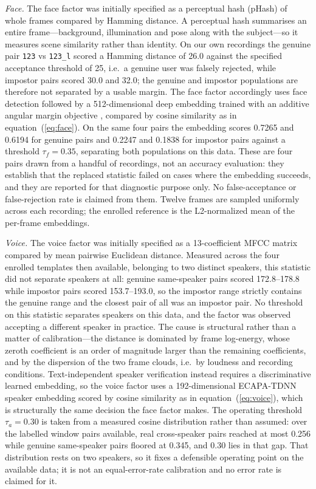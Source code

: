 \documentclass[10pt,journal,compsoc]{IEEEtran}
\begin{document}
{\emph{Face.} The face factor was initially specified as a perceptual hash (pHash) of whole frames compared by Hamming distance. A perceptual hash summarises an entire frame---background, illumination and pose along with the subject---so it measures scene similarity rather than identity. On our own recordings the genuine pair \texttt{123} vs \texttt{123\_l} scored a Hamming distance of 26.0 against the specified acceptance threshold of 25, i.e.\ a genuine user was falsely rejected, while impostor pairs scored 30.0 and 32.0; the genuine and impostor populations are therefore not separated by a usable margin. The face factor accordingly uses face detection followed by a 512-dimensional deep embedding trained with an additive angular margin objective \cite{arcface}, compared by cosine similarity as in equation~(\ref{eq:face}). On the same four pairs the embedding scores 0.7265 and 0.6194 for genuine pairs and 0.2247 and 0.1838 for impostor pairs against a threshold $\tau_f = 0.35$, separating both populations on this data. These are four pairs drawn from a handful of recordings, not an accuracy evaluation: they establish that the replaced statistic failed on cases where the embedding succeeds, and they are reported for that diagnostic purpose only. No false-acceptance or false-rejection rate is claimed from them. Twelve frames are sampled uniformly across each recording; the enrolled reference is the L2-normalized mean of the per-frame embeddings.

\emph{Voice.} The voice factor was initially specified as a 13-coefficient MFCC matrix compared by mean pairwise Euclidean distance. Measured across the four enrolled templates then available, belonging to two distinct speakers, this statistic did not separate speakers at all: genuine same-speaker pairs scored 172.8--178.8 while impostor pairs scored 153.7--193.0, so the impostor range strictly contains the genuine range and the closest pair of all was an impostor pair. No threshold on this statistic separates speakers on this data, and the factor was observed accepting a different speaker in practice. The cause is structural rather than a matter of calibration---the distance is dominated by frame log-energy, whose zeroth coefficient is an order of magnitude larger than the remaining coefficients, and by the dispersion of the two frame clouds, i.e.\ by loudness and recording conditions. Text-independent speaker verification instead requires a discriminative learned embedding, so the voice factor uses a 192-dimensional ECAPA-TDNN speaker embedding \cite{ecapa} scored by cosine similarity as in equation~(\ref{eq:voice}), which is structurally the same decision the face factor makes. The operating threshold $\tau_a = 0.30$ is taken from a measured cosine distribution rather than assumed: over the labelled window pairs available, real cross-speaker pairs reached at most 0.256 while genuine same-speaker pairs floored at 0.345, and 0.30 lies in that gap. That distribution rests on two speakers, so it fixes a defensible operating point on the available data; it is not an equal-error-rate calibration and no error rate is claimed for it.

}
\end{document}
